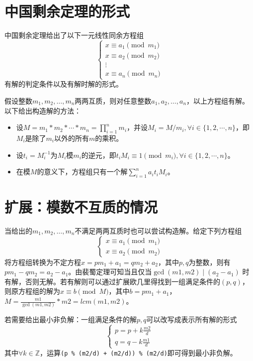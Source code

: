 \documentclass[]{book}
\begin{document}
\section{中国剩余定理的形式}
中国剩余定理给出了以下一元线性同余方程组
$$
\left\{\begin{matrix}
    x \equiv a_{1} \pmod{m_{1}}\\
    x \equiv a_{2} \pmod{m_{2}} \\
    \vdots \\
    x \equiv a_{n} \pmod{m_{n}}
    \end{matrix}\right.
$$
有解的判定条件以及有解时解的形式。

假设整数$m_1,m_2,\ldots,m_n$两两互质，则对任意整数$a_1,a_2,\ldots,a_n$，以上方程组有解。以下给出构造解的方法：
\begin{itemize}
    \item 
    设$M=m_1*m_2*\cdots*m_n=\prod_{i=1}^{n} m_i$，并设$M_i = M / m_i, \forall i \in \{1,2,\cdots ,n\}$，即$M_i$是除了$m_i$以外的所有$m$的乘积。
    \item
    设$t_i=M_i^{-1}$为$M_i$模$m_i$的逆元，即$t_i M_i \equiv 1 \pmod{m_i}, \forall i \in \{1,2,\cdots ,n\}$。
    \item
    在模$M$的意义下，方程组只有一个解$\sum_{i = 1}^{n} a_i t_i M_i$。
\end{itemize}

\section{扩展：模数不互质的情况}
当给出的$m_1,m_2,\ldots,m_n$不满足两两互质时也可以尝试构造解。给定下列方程组
$$
\left\{\begin{matrix}
    x \equiv a_{1} \pmod{m_{1}}\\
    x \equiv a_{2} \pmod{m_{2}}
    \end{matrix}\right.
$$
将方程组转换为不定方程$x = pm_1 + a_1 = qm_2 + a_2$，其中$p,q$为整数，则有$pm_1 - qm_2 = a_2 - a_1$。由裴蜀定理可知当且仅当$\gcd(m1, m2) \mid (a_2 - a_1)$
时有解，否则无解。若有解则可以通过扩展欧几里得找到一组满足条件的$(p, q)$，则原方程组的解为$x \equiv b \pmod{M}$，其中$b=pm_1 + a_1$，$M = \frac{m1}{\gcd(m1, m2)} * m2 = lcm(m1, m2)$。


若需要给出最小非负解：一组满足条件的解${p, q}$可以改写成表示所有解的形式
$$
\left\{\begin{matrix}
    p = p + k\frac{m2}{d}\\
    q = q - k\frac{m1}{d}
    \end{matrix}\right.
$$
其中$\forall k \in \mathbb{Z}$，运算\verb|(p % (m2/d) + (m2/d)) % (m2/d)|即可得到最小非负解。
\end{document}
